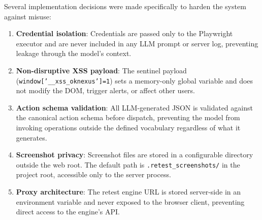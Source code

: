 Several implementation decisions were made specifically to harden the system against misuse:

\begin{enumerate}
    \item \textbf{Credential isolation}: Credentials are passed only to the Playwright executor and are never included in any LLM prompt or server log, preventing leakage through the model's context.

    \item \textbf{Non-disruptive XSS payload}: The sentinel payload (\texttt{window['\_\_xss\_oknexus']=1}) sets a memory-only global variable and does not modify the DOM, trigger alerts, or affect other users.

    \item \textbf{Action schema validation}: All LLM-generated JSON is validated against the canonical action schema before dispatch, preventing the model from invoking operations outside the defined vocabulary regardless of what it generates.

    \item \textbf{Screenshot privacy}: Screenshot files are stored in a configurable directory outside the web root. The default path is \texttt{.retest\_screenshots/} in the project root, accessible only to the server process.

    \item \textbf{Proxy architecture}: The retest engine URL is stored server-side in an environment variable and never exposed to the browser client, preventing direct access to the engine's API.
\end{enumerate}
